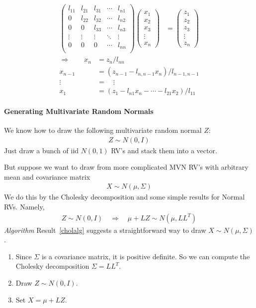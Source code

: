 \documentclass[12pt]{article}
\numberwithin{equation}{section} %
\theoremstyle{plain}
\theoremstyle{definition}
\theoremstyle{remark}
\begin{document}
\begin{align*}
  \begin{pmatrix}
    l_{11} & l_{21}  & l_{31} & \cdots & l_{n1}  \\
    0 & l_{22} &  l_{32} & \cdots & l_{n2}\\
    0 & 0 & l_{33}& \cdots & l_{n3}\\
    \vdots & \vdots & \vdots & \ddots & \vdots\\
    0 & 0 & 0 &\cdots & l_{nn}\\
  \end{pmatrix}
  \begin{pmatrix}
    x_1 \\ x_2 \\ x_3 \\ \vdots \\ x_n
  \end{pmatrix}
  &=
  \begin{pmatrix}
    z_1 \\ z_2 \\ z_3 \\ \vdots \\ z_n
  \end{pmatrix}
\end{align*}
\begin{align*}
  \Rightarrow \qquad
  x_n &= z_n/l_{nn} \\
  x_{n-1} &= (z_{n-1} - l_{n,n-1}x_n)/l_{n-1,n-1} \\
  \vdots \; &= \quad \vdots\\
  x_1 &= (z_1 - l_{n1}x_n - \cdots - l_{21}x_{2})/l_{11}
\end{align*}

\paragraph{Generating Multivariate Random Normals}
We know how to draw the following multivariate random normal $Z$:
\begin{align*}
  Z \sim N(0,I)
\end{align*}
Just draw a bunch of iid $N(0,1)$ RV's and stack them into a vector.

But suppose we want to draw from more complicated MVN RV's with
arbitrary mean and covariance matrix
\begin{align*}
  X \sim N(\mu, \Sigma)
\end{align*}
We do this by the Cholesky decomposition and some simple results for
Normal RVs. Namely,
\begin{align}
  Z \sim N(0,I) \quad \Rightarrow \quad
  \mu+LZ \sim N(\mu, LL^T)
  \label{cholalg}
\end{align}
{\sl Algorithm}\: Result~\ref{cholalg} suggests a straightforward way
to draw $X\sim N(\mu,\Sigma)$.
\begin{enumerate}
  \item Since $\Sigma$ is a covariance matrix, it is positive definite.
    So we can compute the Cholesky decomposition $\Sigma=LL^T$.
  \item Draw $Z\sim N(0,I)$.
  \item Set $X=\mu+LZ$.
\end{enumerate}
\end{document}
